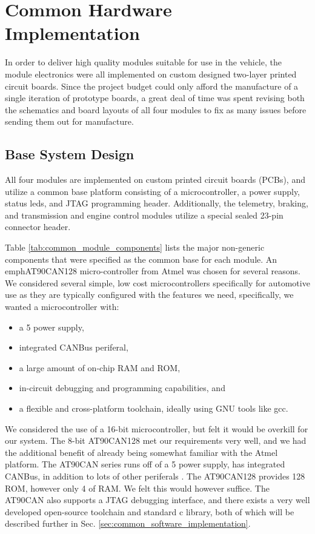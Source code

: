 \section{Common Hardware Implementation\label{sec:common_hardware_implementation}}

In order to deliver high quality modules suitable for use in the vehicle, the module electronics were all implemented on custom designed two-layer printed circuit boards. Since the project budget could only afford the manufacture of a single iteration of prototype boards, a great deal of time was spent revising both the schematics and board layouts of all four modules to fix as many issues before sending them out for manufacture.


\subsection{Base System Design}

All four modules are implemented on custom printed circuit boards (PCBs), and utilize a common base platform consisting of a microcontroller, a power supply, status leds, and JTAG programming header. Additionally, the telemetry, braking, and transmission and engine control modules utilize a special sealed 23-pin connector header.

Table \ref{tab:common_module_components} lists the major non-generic components that were specified as the common base for each module. An emph{AT90CAN128} micro-controller from Atmel was chosen for several reasons. We considered several simple, low cost microcontrollers specifically for automotive use as they are typically configured with the features we need, specifically, we wanted a microcontroller with:

\begin{itemize}
  \item a \unit{5}{\volt} power supply,
  \item integrated CANBus periferal,
  \item a large amount of on-chip RAM and ROM,
  \item in-circuit debugging and programming capabilities, and
  \item a flexible and cross-platform toolchain, ideally using GNU tools like gcc.
\end{itemize}

We considered the use of a 16-bit microcontroller, but felt it would be overkill for our system. The 8-bit AT90CAN128 met our requirements very well, and we had the additional benefit of already being somewhat familiar with the Atmel platform. The AT90CAN series runs off of a \unit{5}{\volt} power supply, has integrated CANBus, in addition to lots of other periferals \cite{AT90CAN}. The AT90CAN128 provides \unit{128}{\kilo\byte} ROM, however only \unit{4}{\kilo\byte} of RAM. We felt this would however suffice. The AT90CAN also supports a JTAG debugging interface, and there exists a very well developed open-source toolchain and standard c library, both of which will be described further in Sec. \ref{sec:common_software_implementation}.

